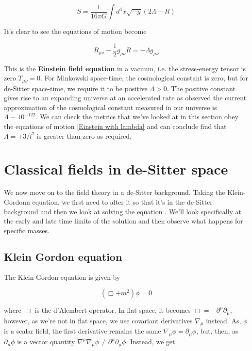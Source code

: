 \documentclass[a4paper,11pt]{article}
\numberwithin{equation}{section}
\numberwithin{figure}{section}
\begin{document}
\begin{large}
\begin{equation}
\label{new action}
    S=\frac{1}{16\pi G} \int d^4x \sqrt{-g} (2\Lambda-R)
\end{equation}

It's clear to see the equations of motion become

\begin{equation}
\label{Einstein with lambda}
    R_{\mu \nu}-\frac{1}{2}g_{\mu \nu} R=-\Lambda g_{\mu \nu}
\end{equation}

This is the \textbf{Einstein field equation} in a vacuum, i.e. the stress-energy tensor is zero $T_{\mu \nu}=0$. For Minkowski space-time, the cosmological constant is zero, but for de-Sitter space-time, we require it to be positive $\Lambda>0$. The positive constant gives rise to an expanding universe at an accelerated rate as observed \cite{Bousso_2007,Barrow_2011} the current approximation of the cosmological constant measured in our universe is $\Lambda \sim 10^{-122}$. We can check the metrics that we've looked at in this section obey the equations of motion \eqref{Einstein with lambda} and can conclude find that $\Lambda=+3/l^2$ is greater than zero as required.

\newpage

\section{\Large Classical fields in de-Sitter space}

We now move on to the field theory in a de-Sitter background. Taking the Klein-Gordonn equation, we first need to alter it so that it's in the de-Sitter background and then we look at solving the equation \cite{article}. We'll look specifically at the early and late time limits of the solution and then observe what happens for specific masses.


\subsection{Klein Gordon equation}

The Klein-Gordon equation is given by 

\begin{equation}
\label{Klein Gordon}    
    (\Box+m^2)\phi=0
\end{equation}

where $\Box$ is the d'Alembert operator. In flat space, it becomes $\Box=-\partial^\mu\partial_\mu$, however, as we're not in flat space, we use covariant derivatives $\nabla_\mu$ instead. As, $\phi$ is a scalar field, the first derivative remains the same $\nabla_\mu\phi=\partial_\mu\phi$, but, then, as $\partial_\mu\phi$ is a vector quantity $\nabla^\mu\nabla_\mu\phi \neq \partial^\mu \partial_\mu\phi$. Instead, we get


\end{large}
\end{document}
